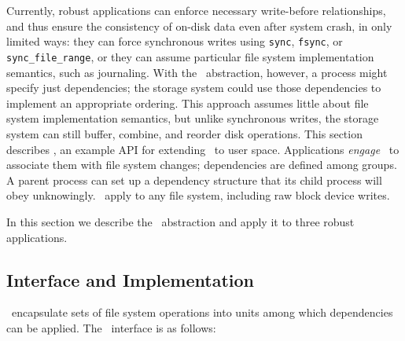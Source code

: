 \section{\Patchgroups}
\label{sec:patchgroup}



Currently,
robust applications
%
can enforce necessary write-before relationships, and thus ensure the
consistency of on-disk data even after system crash, in only limited
ways:
%
they can force synchronous writes using
\texttt{sync}, \texttt{fsync}, or \texttt{sync\_file\_range}, or
%
they can assume particular file system implementation
semantics, such as journaling.
%
With the \patch\ abstraction, however, a process might specify
just dependencies; the storage system could use those dependencies to implement
an appropriate ordering.
%
This approach assumes little about file system implementation semantics,
but unlike synchronous writes, the storage system can still
buffer, combine, and reorder disk operations.
%
This section describes \emph{\patchgroups}, an example API for extending
\patches\ to user space.
%
Applications \emph{engage} \patchgroups\ to associate them with file system
changes; dependencies are
defined among groups.  A parent process can set up a dependency structure
that its child process will obey unknowingly.  \Patchgroups\ apply to
any file system, including raw block device writes.  

In this section we describe the \patchgroup\ abstraction
%
and apply it to three robust applications.


\subsection{Interface and Implementation}
\label{sec:patchgroup:interface}

\Patchgroups\ encapsulate sets of file system operations into units among
which dependencies can be applied.
%
%
The \patchgroup\ interface is as follows:

